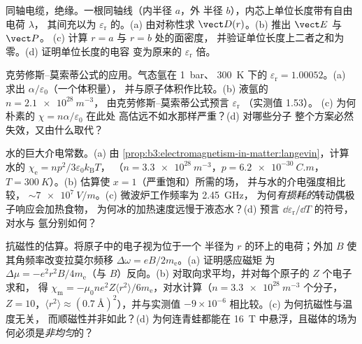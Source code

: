 \begin{exercise}[$\star\star$]\label{exo:b3:electromagnetism-in-matter:5}
同轴电缆，绝缘。一根同轴线（内半径 $a$，外
半径 $b$），内芯上单位长度带有自由电荷 $\lambda$，
其间充以为 $\varepsilon_{\text{r}}$ 的。(a) 由对称性求
$\vect D(r)$。(b) 推出 $\vect E$ 与 $\vect P$。
(c) 计算 $r = a$ 与 $r = b$ 处的面密度，
并验证单位长度上二者之和为零。(d) 证明单位长度的电容
变为原来的 $\varepsilon_{\text{r}}$ 倍。
\end{exercise}

\begin{exercise}[$\star\star$]\label{exo:b3:electromagnetism-in-matter:6}
克劳修斯–莫索蒂公式的应用。气态氩在 \qty{1}{bar}、
\qty{300}{K} 下的 $\varepsilon_{\text{r}} = 1.00052$。(a) 求出 $\alpha/\varepsilon_0$（一个体积量），
并与原子体积作比较。(b) 液氩的 $n = \qty{2.1e28}{m^{-3}}$，
由克劳修斯–莫索蒂公式预言 $\varepsilon_{\text{r}}$
（实测值 1.53）。
(c) 为何朴素的 $\chi = n\alpha/\varepsilon_0$ 在此处
高估远不如水那样严重？(d) 对哪些分子
整个方案必然失效，又由什么取代？
\end{exercise}

\begin{exercise}[$\star\star$]\label{exo:b3:electromagnetism-in-matter:7}
水的巨大介电常数。(a) 由
\cref{prop:b3:electromagnetism-in-matter:langevin}，计算
水的 $\chi_{\text{e}} = np^2/3\varepsilon_0k_{\text{B}}T$，
（$n = \qty{3.3e28}{m^{-3}}$，$p = \qty{6.2e-30}{C.m}$，
$T = \qty{300}{K}$）。(b) 估算使 $x = 1$（严重饱和）所需的场，
并与水的介电强度相比较，
$\sim\qty{7e7}{V/m}$。(c) 微波炉工作频率为 \qty{2.45}{GHz}，
为何\emph{有损耗的}转动偶极子响应会加热食物，
为何冰的加热速度远慢于液态水？(d) 预言
$\dd\varepsilon_{\text{r}}/\dd T$ 的符号，对水与
氩分别如何？
\end{exercise}

\begin{exercise}[$\star\star$]\label{exo:b3:electromagnetism-in-matter:8}
抗磁性的估算。将原子中的电子视为位于一个
半径为 $r$ 的环上的电荷；外加 $B$ 使其角频率改变拉莫尔频移
$\Delta\omega = eB/2m_{\text{e}}$。(a) 证明感应磁矩
为 $\Delta\mu = -e^2r^2B/4m_{\text{e}}$（与
$B$）反向。(b) 对取向求平均，并对每个原子的 $Z$ 个电子求和，
得 $\chi_{\text{m}} = -\mu_0ne^2Z\langle
r^2\rangle/6m_{\text{e}}$，对水计算（$n =
\qty{3.3e28}{m^{-3}}$ 个分子，$Z = 10$，$\langle r^2\rangle
\approx (\qty{0.7}{\angstrom})^2$），并与实测值
$-9\times10^{-6}$ 相比较。(c) 为何抗磁性与温度无关，
而顺磁性并非如此？(d) 为何连青蛙都能在
\qty{16}{T} 中悬浮，且磁体的场为何必须是\emph{非均匀}的？
\end{exercise}

